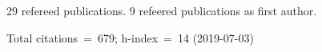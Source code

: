 29 refereed publications. 9 refeered publications as first author.

Total citations~=~679; h-index~=~14 (2019-07-03)